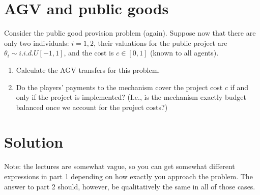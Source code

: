 \documentclass[a4paper]{article}
\newif\ifsolutions
\begin{document}
\section{AGV and public goods}

Consider the public good provision problem (again). Suppose now that there are only two individuals: $i=1,2$, their valuations for the public project are $\theta_i \sim i.i.d. U[-1,1]$, and the cost is $c \in [0,1]$ (known to all agents).

\begin{enumerate}
	\item Calculate the AGV transfers for this problem.
	\item Do the players' payments to the mechanism cover the project cost $c$ if and only if the project is implemented? (I.e., is the mechanism exactly budget balanced once we account for the project costs?)
\end{enumerate}

\ifsolutions
\section*{Solution}
Note: the lectures are somewhat vague, so you can get somewhat different expressions in part 1 depending on how exactly you approach the problem. The answer to part 2 should, however, be qualitatively the same in all of those cases.
\end{document}

